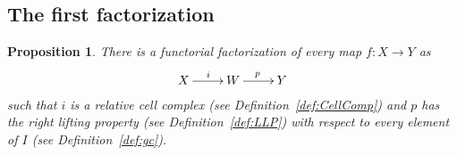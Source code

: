 \documentclass[12pt]{amsart}
\numberwithin{equation}{section}
\theoremstyle{slplain}
\newtheorem{prop}[equation]{Proposition}
\theoremstyle{definition}
\theoremstyle{remark}
\newcommand{\defref}{Definition~\ref}
\begin{document}
\subsection{The first factorization}
\label{sec:FactFirst}

\begin{prop}
  \label{prop:CofFact}
  There is a functorial factorization of every map $f\colon X \to Y$
  as
  \begin{displaymath}
    \xymatrix{
      {X} \ar[r]^{i}
      & {W} \ar[r]^{p}
      & {Y}
    }
  \end{displaymath}
  such that $i$ is a relative cell complex (see \defref{def:CellComp})
  and $p$ has the right lifting property (see \defref{def:LLP}) with
  respect to every element of $I$ (see \defref{def:gc}).
\end{prop}
\end{document}
